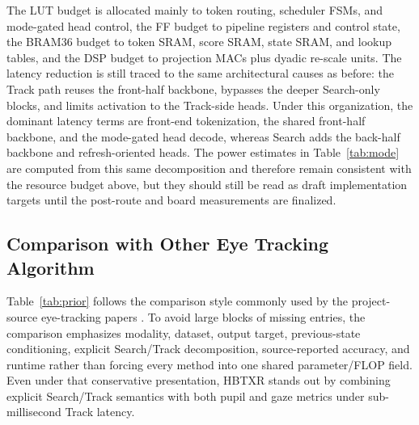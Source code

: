 \documentclass[journal]{IEEEtran}
\begin{document}
The LUT budget is allocated mainly to token routing, scheduler FSMs, and mode-gated head control, the FF budget to pipeline registers and control state, the BRAM36 budget to token SRAM, score SRAM, state SRAM, and lookup tables, and the DSP budget to projection MACs plus dyadic re-scale units. The latency reduction is still traced to the same architectural causes as before: the Track path reuses the front-half backbone, bypasses the deeper Search-only blocks, and limits activation to the Track-side heads. Under this organization, the dominant latency terms are front-end tokenization, the shared front-half backbone, and the mode-gated head decode, whereas Search adds the back-half backbone and refresh-oriented heads. The power estimates in Table~\ref{tab:mode} are computed from this same decomposition and therefore remain consistent with the resource budget above, but they should still be read as draft implementation targets until the post-route and board measurements are finalized.



\subsection{Comparison with Other Eye Tracking Algorithm}
Table~\ref{tab:prior} follows the comparison style commonly used by the project-source eye-tracking papers \cite{ref5,ref6,ref7,ref8,ref9,ref10}. To avoid large blocks of missing entries, the comparison emphasizes modality, dataset, output target, previous-state conditioning, explicit Search/Track decomposition, source-reported accuracy, and runtime rather than forcing every method into one shared parameter/FLOP field. Even under that conservative presentation, HBTXR stands out by combining explicit Search/Track semantics with both pupil and gaze metrics under sub-millisecond Track latency.
\end{document}
